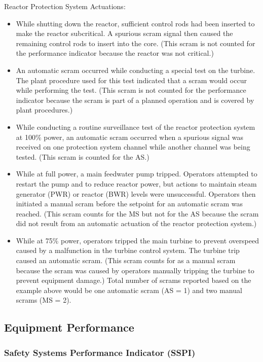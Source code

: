 Reactor Protection System Actuations:
\begin{itemize}
\item  While shutting down the reactor, sufficient control rods had been inserted to make the reactor subcritical. A spurious scram signal then caused the remaining control rods to insert into the core. (This scram is not counted for the performance indicator because the reactor was not critical.)
\item  An automatic scram occurred while conducting a special test on the turbine. The plant procedure used for this test indicated that a scram would occur while performing the test. (This scram is not counted for the performance indicator because the scram is part of a planned operation and is covered by plant procedures.)
\item While conducting a routine surveillance test of the reactor protection system at 100\% power, an automatic scram occurred when a spurious signal was received on one protection system channel while another channel was being tested. (This scram is counted for the AS.)
\item While at full power, a main feedwater pump tripped. Operators attempted to restart the pump and to reduce reactor power, but actions to maintain steam generator (PWR) or reactor (BWR) levels were unsuccessful. Operators then initiated a manual scram before the setpoint for an automatic scram was reached. (This scram counts for the MS but not for the AS because the scram did not result from an automatic actuation of the reactor protection system.)
\item While at 75\% power, operators tripped the main turbine to prevent overspeed caused by a malfunction in the turbine control system. The turbine trip caused an automatic scram. (This scram counts for as a manual scram because the scram was caused by operators manually tripping the turbine to prevent equipment damage.)
Total number of scrams reported based on the example above would be one automatic scram (AS = 1) and two manual scrams (MS = 2).
\end{itemize}

\subsection{Equipment Performance}
\subsubsection{Safety Systems Performance Indicator (SSPI)}
